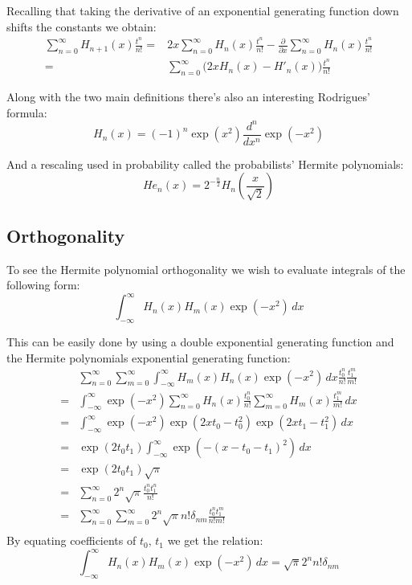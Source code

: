 Recalling that taking the derivative of an exponential generating function down shifts the constants we obtain:
\begin{equation*}
\begin{aligned}
\sum_{n=0}^\infty H_{n+1}(x)\frac{t^n}{n!} =& 2x\sum_{n=0}^{\infty}H_n(x)\frac{t^n}{n!}-\frac{\partial}{\partial x}\sum_{n=0}^\infty H_n(x)\frac{t^n}{n!}\\
=& \sum_{n=0}^\infty\bigg(2xH_n(x)-H'_n(x)\bigg)\frac{t^n}{n!}
\end{aligned}
\end{equation*}

Along with the two main definitions there's also an interesting Rodrigues' formula:
\[H_n(x) = (-1)^n\exp(x^2)\frac{d^n}{d x^n}\exp(-x^2)\]

And a rescaling used in probability called the probabilists' Hermite polynomials:
\[He_n(x) = 2^{-\frac{n}{2}}H_n\left(\frac{x}{\sqrt{2}}\right)\]
\subsection{Orthogonality} 
To see the Hermite polynomial orthogonality we wish to evaluate integrals of the following form:
\[\int_{-\infty}^{\infty}H_n(x)H_m(x)\exp(-x^2)\,dx\]

This can be easily done by using a double exponential generating function and the Hermite polynomials exponential generating function:
\begin{equation*}
\begin{aligned}
&\sum_{n=0}^{\infty}\sum_{m=0}^{\infty}\int_{-\infty}^{\infty}H_m(x)H_n(x)\exp(-x^2)\,dx\frac{t_0^n}{n!}\frac{t_1^m}{m!}\\
=&\int_{-\infty}^{\infty}\exp(-x^2)\sum_{n=0}^{\infty}H_n(x)\frac{t_0^n}{n!}\sum_{m=0}^{\infty}H_m(x)\frac{t_1^m}{m!}\,dx \\
=&\int_{-\infty}^{\infty}\exp(-x^2)\exp(2xt_0-t_0^2)\exp(2xt_1-t_1^2)\,dx \\
=&\exp(2t_0t_1)\int_{-\infty}^{\infty}\exp(-(x-t_0-t_1)^2)\,dx\\
=&\exp(2t_0t_1)\sqrt{\pi}\\
=&\sum_{n=0}^{\infty}2^n\sqrt{\pi}\frac{t_0^nt_1^n}{n!} \\
=&\sum_{n=0}^{\infty}\sum_{m=0}^{\infty}2^n\sqrt{\pi}n!\delta_{nm}\frac{t_0^nt_1^m}{n!m!} \\
\end{aligned}
\end{equation*}
By equating coefficients of $t_0,\,t_1$ we get the relation:
\[\int_{-\infty}^\infty H_n(x)H_m(x)\exp(-x^2)\,dx = \sqrt{\pi}2^nn!\delta_{nm}\]

